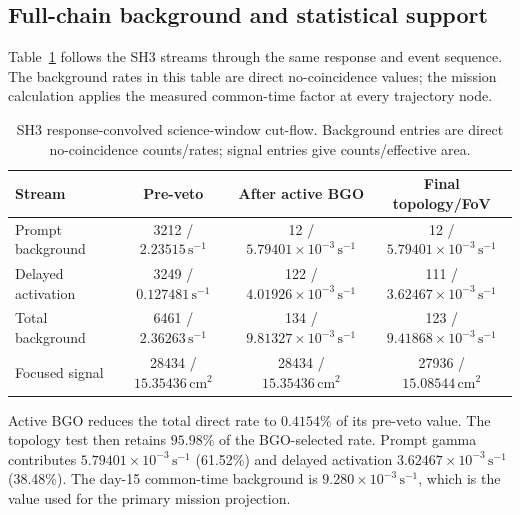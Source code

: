 \documentclass[11pt]{article}
\newcommand{\cps}{\ensuremath{\,\mathrm{s^{-1}}}}
\begin{document}
\FloatBarrier

\subsection{Full-chain background and statistical support}
\label{subsec:optimized_fullchain}

Table~\ref{tab:optimized_cutflow} follows the SH3 streams through the same
response and event sequence. The background rates in this table are direct
no-coincidence values; the mission calculation applies the measured common-time
factor at every trajectory node.

\begin{table}[!ht]
\centering
\caption{SH3 response-convolved science-window cut-flow. Background entries are
direct no-coincidence counts/rates; signal entries give counts/effective area.}
\label{tab:optimized_cutflow}
\footnotesize
\begin{tabular}{lccc}
\toprule
Stream & Pre-veto & After active BGO & Final topology/FoV \\
\midrule
Prompt background & 3212 / $2.23515\cps$ & 12 / $5.79401\times10^{-3}\cps$ & 12 / $5.79401\times10^{-3}\cps$ \\
Delayed activation & 3249 / $0.127481\cps$ & 122 / $4.01926\times10^{-3}\cps$ & 111 / $3.62467\times10^{-3}\cps$ \\
Total background & 6461 / $2.36263\cps$ & 134 / $9.81327\times10^{-3}\cps$ & 123 / $9.41868\times10^{-3}\cps$ \\
Focused signal & 28434 / $15.35436\,\mathrm{cm^2}$ & 28434 / $15.35436\,\mathrm{cm^2}$ & 27936 / $15.08544\,\mathrm{cm^2}$ \\
\bottomrule
\end{tabular}
\end{table}

Active BGO reduces the total direct rate to $0.4154\%$ of its pre-veto value.
The topology test then retains $95.98\%$ of the BGO-selected rate. Prompt gamma
contributes $5.79401\times10^{-3}\cps$ (61.52\%) and delayed activation
$3.62467\times10^{-3}\cps$ (38.48\%). The day-15 common-time background is
$9.280\times10^{-3}\cps$, which is the value used for the primary mission
projection.
\end{document}
